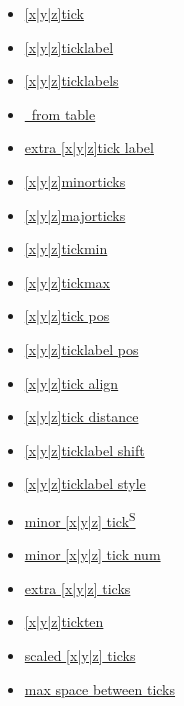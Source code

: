 \begin{multicols}{2}
{\footnotesize \color{blue}
\begin{itemize}[leftmargin=1mm,label={}]
    \item \href{\docurl\#pgfp./pgfplots/xtick}{{[x|y|z]}tick}
    \item \href{\docurl\#pgfp./pgfplots/xticklabel}{{[x|y|z]}ticklabel}
    \item \href{\docurl\#pgfp./pgfplots/xticklabels}{{[x|y|z]}ticklabels}
    \item \href{\docurl\#pgfp./pgfplots/xticklabels:from:table}{\textquotesingle\textquotesingle\textquotesingle\  from table}
    \item \href{\docurl\#pgfp./pgfplots/extra:xtick:label}{extra [x|y|z]tick label}
    \item \href{\docurl\#pgfp./pgfplots/xminorticks}{{[x|y|z]}minorticks}
    \item \href{\docurl\#pgfp./pgfplots/xmajorticks}{{[x|y|z]}majorticks}
    \item \href{\docurl\#pgfp./pgfplots/xtickmin}{{[x|y|z]}tickmin}
    \item \href{\docurl\#pgfp./pgfplots/xtickmax}{{[x|y|z]}tickmax}
    \item \href{\docurl\#pgfp./pgfplots/xtick:pos}{{[x|y|z]}tick pos}
    \item \href{\docurl\#pgfp./pgfplots/xticklabel:pos}{{[x|y|z]}ticklabel pos}
    \item \href{\docurl\#pgfp./pgfplots/xtick:align}{{[x|y|z]}tick align}
    \item \href{\docurl\#pgfp./pgfplots/xtick:distance}{{[x|y|z]}tick distance}
    \item \href{\docurl\#pgfp./pgfplots/xticklabel:shift}{{[x|y|z]}ticklabel shift}
    \item \href{\docurl\#pgfp./pgfplots/xticklabel:style}{{[x|y|z]}ticklabel style}
    \item \href{\docurl\#pgfp./pgfplots/minor:x:tick}{minor [x|y|z] tick\textsuperscript{S}}
    \item \href{\docurl\#pgfp./pgfplots/minor:x:tick:num}{minor [x|y|z] tick num}
    \item \href{\docurl\#pgfp./pgfplots/extra:x:ticks}{extra [x|y|z] ticks}
    \item \href{\docurl\#pgfp./pgfplots/xtickten}{{[x|y|z]}tickten}
    \item \href{\docurl\#pgfp./pgfplots/scaled:x:ticks}{scaled {[x|y|z]} ticks}
    \item \href{\docurl\#pgfp./pgfplots/max:space:between:ticks}{max space between ticks}

\end{itemize}}
\end{multicols}
